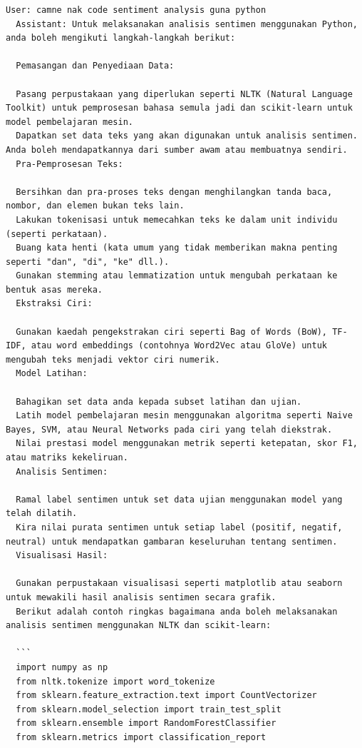 \documentclass{article}
\begin{document}
\begin{lstlisting}[breaklines=true]
  User: camne nak code sentiment analysis guna python
  Assistant: Untuk melaksanakan analisis sentimen menggunakan Python, anda boleh mengikuti langkah-langkah berikut:

  Pemasangan dan Penyediaan Data:
  
  Pasang perpustakaan yang diperlukan seperti NLTK (Natural Language Toolkit) untuk pemprosesan bahasa semula jadi dan scikit-learn untuk model pembelajaran mesin.
  Dapatkan set data teks yang akan digunakan untuk analisis sentimen. Anda boleh mendapatkannya dari sumber awam atau membuatnya sendiri.
  Pra-Pemprosesan Teks:
  
  Bersihkan dan pra-proses teks dengan menghilangkan tanda baca, nombor, dan elemen bukan teks lain.
  Lakukan tokenisasi untuk memecahkan teks ke dalam unit individu (seperti perkataan).
  Buang kata henti (kata umum yang tidak memberikan makna penting seperti "dan", "di", "ke" dll.).
  Gunakan stemming atau lemmatization untuk mengubah perkataan ke bentuk asas mereka.
  Ekstraksi Ciri:
  
  Gunakan kaedah pengekstrakan ciri seperti Bag of Words (BoW), TF-IDF, atau word embeddings (contohnya Word2Vec atau GloVe) untuk mengubah teks menjadi vektor ciri numerik.
  Model Latihan:
  
  Bahagikan set data anda kepada subset latihan dan ujian.
  Latih model pembelajaran mesin menggunakan algoritma seperti Naive Bayes, SVM, atau Neural Networks pada ciri yang telah diekstrak.
  Nilai prestasi model menggunakan metrik seperti ketepatan, skor F1, atau matriks kekeliruan.
  Analisis Sentimen:
  
  Ramal label sentimen untuk set data ujian menggunakan model yang telah dilatih.
  Kira nilai purata sentimen untuk setiap label (positif, negatif, neutral) untuk mendapatkan gambaran keseluruhan tentang sentimen.
  Visualisasi Hasil:
  
  Gunakan perpustakaan visualisasi seperti matplotlib atau seaborn untuk mewakili hasil analisis sentimen secara grafik.
  Berikut adalah contoh ringkas bagaimana anda boleh melaksanakan analisis sentimen menggunakan NLTK dan scikit-learn:
  
  ```
  import numpy as np
  from nltk.tokenize import word_tokenize
  from sklearn.feature_extraction.text import CountVectorizer
  from sklearn.model_selection import train_test_split
  from sklearn.ensemble import RandomForestClassifier
  from sklearn.metrics import classification_report
  

\end{lstlisting}
\end{document}
